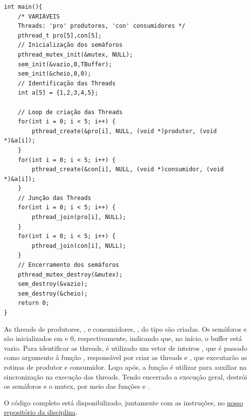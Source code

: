 \documentclass[
	12pt,				%
	openright,			%
	oneside,			%
	a4paper,			%
	chapter=TITLE,		%
	english,			%
	french,				%
	spanish,			%
	brazil				%
	]{abntex2}
\theoremstyle{definition}
\begin{document}
\begin{verbatim}
int main(){
    /* VARIÁVEIS 
    Threads: 'pro' produtores, 'con' consumidores */
    pthread_t pro[5],con[5];
    // Inicialização dos semáforos
    pthread_mutex_init(&mutex, NULL);
    sem_init(&vazio,0,TBuffer);
    sem_init(&cheio,0,0);
    // Identificação das Threads
    int a[5] = {1,2,3,4,5};

    // Loop de criação das Threads
    for(int i = 0; i < 5; i++) {
        pthread_create(&pro[i], NULL, (void *)produtor, (void *)&a[i]);
    }
    for(int i = 0; i < 5; i++) {
        pthread_create(&con[i], NULL, (void *)consumidor, (void *)&a[i]);
    }
    // Junção das Threads
    for(int i = 0; i < 5; i++) {
        pthread_join(pro[i], NULL);
    }
    for(int i = 0; i < 5; i++) {
        pthread_join(con[i], NULL);
    }
    // Encerramento dos semáforos
    pthread_mutex_destroy(&mutex);
    sem_destroy(&vazio);
    sem_destroy(&cheio);
    return 0;
}
\end{verbatim}

As threads de produtores, , e consumidores, , do tipo  são criadas. Os semáforos  e  são inicializados em  e 0, respectivamente, indicando que, no início, o buffer está vazio. Para identificar as threads, é utilizado um vetor de inteiros , que é passado como argumento à função , responsável por criar as threads  e , que executarão as rotinas de produtor e consumidor. Logo após, a função  é utilizar para auxiliar na sincronização na execução das threads. Tendo encerrado a execução geral, destrói os semáforos e o mutex, por meio das funções  e .

O código completo está disponibilizado, juntamente com as instruções, no \href{https://github.com/jvictorferreira3301/Sistemas_Operacionais}{nosso repositório da disciplina}.
\end{document}
